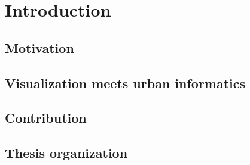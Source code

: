 \chapter{Introduction}\label{chap:intro}

\section{Motivation}

\section{Visualization meets urban informatics}

\section{Contribution}

\section{Thesis organization}